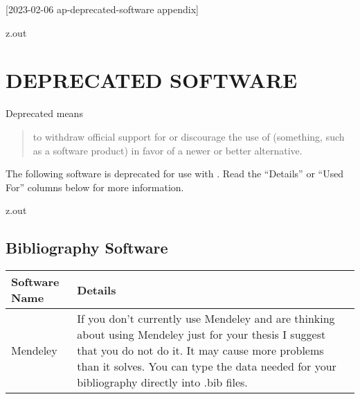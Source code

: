 [2023-02-06 ap-deprecated-software appendix]

\begin{VerbatimOut}{z.out}
\chapter{DEPRECATED SOFTWARE}

Deprecated means
\cite{merriam-webster-deprecated}
\begin{quote}
  to withdraw official support for or discourage the use of
  (something, such as a software product)
  in favor of a newer or better alternative.
\end{quote}

The following software is deprecated for use with \PurdueThesisLogo.
Read the ``Details''
or ``Used For''
columns below for more information.
\end{VerbatimOut}

\MyIO


\begin{VerbatimOut}{z.out}


\section{Bibliography Software}

\noindent
\begin{tabularx}{\textwidth}{@{}lX@{}}
  \toprule
  \bf Software Name& \bf Details\\
  \midrule
  Mendeley&
    If you don't currently use Mendeley
    and are thinking about using Mendeley just for your thesis
    I suggest that you do not do it.
    It may cause more problems than it solves.
    You can type the data needed for your bibliography
    directly into .bib files.\\
  \bottomrule
\end{tabularx}
\end{VerbatimOut}

\MyIO



